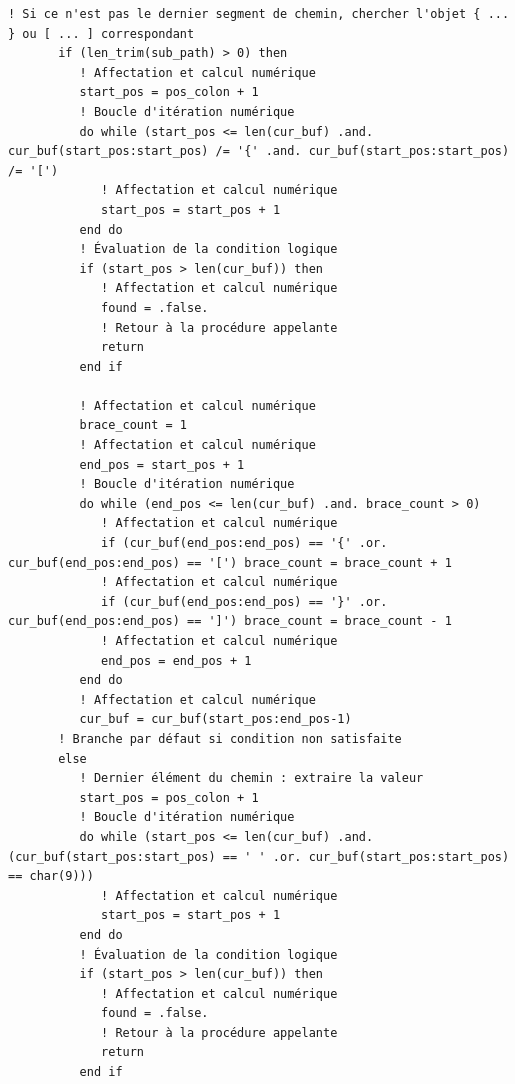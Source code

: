 \documentclass[10pt,a4paper,oneside]{book}
\begin{document}
\begin{lstlisting}[language={[95]Fortran}]
       ! Si ce n'est pas le dernier segment de chemin, chercher l'objet { ... } ou [ ... ] correspondant
       if (len_trim(sub_path) > 0) then
          ! Affectation et calcul numérique
          start_pos = pos_colon + 1
          ! Boucle d'itération numérique
          do while (start_pos <= len(cur_buf) .and. cur_buf(start_pos:start_pos) /= '{' .and. cur_buf(start_pos:start_pos) /= '[')
             ! Affectation et calcul numérique
             start_pos = start_pos + 1
          end do
          ! Évaluation de la condition logique
          if (start_pos > len(cur_buf)) then
             ! Affectation et calcul numérique
             found = .false.
             ! Retour à la procédure appelante
             return
          end if

          ! Affectation et calcul numérique
          brace_count = 1
          ! Affectation et calcul numérique
          end_pos = start_pos + 1
          ! Boucle d'itération numérique
          do while (end_pos <= len(cur_buf) .and. brace_count > 0)
             ! Affectation et calcul numérique
             if (cur_buf(end_pos:end_pos) == '{' .or. cur_buf(end_pos:end_pos) == '[') brace_count = brace_count + 1
             ! Affectation et calcul numérique
             if (cur_buf(end_pos:end_pos) == '}' .or. cur_buf(end_pos:end_pos) == ']') brace_count = brace_count - 1
             ! Affectation et calcul numérique
             end_pos = end_pos + 1
          end do
          ! Affectation et calcul numérique
          cur_buf = cur_buf(start_pos:end_pos-1)
       ! Branche par défaut si condition non satisfaite
       else
          ! Dernier élément du chemin : extraire la valeur
          start_pos = pos_colon + 1
          ! Boucle d'itération numérique
          do while (start_pos <= len(cur_buf) .and. (cur_buf(start_pos:start_pos) == ' ' .or. cur_buf(start_pos:start_pos) == char(9)))
             ! Affectation et calcul numérique
             start_pos = start_pos + 1
          end do
          ! Évaluation de la condition logique
          if (start_pos > len(cur_buf)) then
             ! Affectation et calcul numérique
             found = .false.
             ! Retour à la procédure appelante
             return
          end if


\end{lstlisting}
\end{document}
